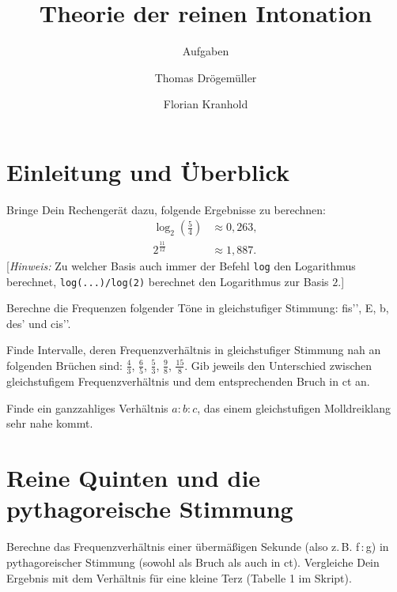 \documentclass[ngerman,11pt]{scrartcl}
\title     {Theorie der reinen Intonation}
\author    {Thomas Drögemüller\and Florian Kranhold}
\subtitle  {Aufgaben}
\begin{document}
\maketitle

\section{Einleitung und Überblick}

\begin{aufg}
  Bringe Dein Rechengerät dazu, folgende Ergebnisse zu berechnen:
  \begin{align*}
    \log_2(\tfrac54) &\approx 0{,}263,\\
    2^{\frac{11}{12}} &\approx 1{,}887.
  \end{align*}
  [\emph{Hinweis:} Zu welcher Basis auch immer der Befehl \texttt{log} den Logarithmus
  berechnet, \texttt{log(...)/log(2)} berechnet den Logarithmus zur Basis $2$.]
\end{aufg}

\begin{aufg}
  Berechne die Frequenzen folgender Töne in gleichstufiger Stimmung: fis’’, E,
  b, des’ und cis’’.
\end{aufg}

\begin{aufg}
  Finde Intervalle, deren Frequenzverhältnis in gleichstufiger Stimmung nah an
  folgenden Brüchen sind: $\frac43$, $\frac65$, $\frac53$, $\frac98$,
  $\frac{15}8$. Gib jeweils den Unterschied zwischen gleichstufigem
  Frequenzverhältnis und dem entsprechenden Bruch in ct an.
\end{aufg}

\begin{aufg}
  Finde ein ganzzahliges Verhältnis $a:b:c$, das einem gleichstufigen
  Molldreiklang sehr nahe kommt.
\end{aufg}

\section{Reine Quinten und die pythagoreische Stimmung}

\begin{aufg}
  Berechne das Frequenzverhältnis einer übermäßigen Sekunde (also
  z.\,B. f\,:\,\sharp g) in pythagoreischer Stimmung (sowohl als Bruch als auch
  in ct). Vergleiche Dein Ergebnis mit dem Verhältnis für eine kleine Terz
  (Tabelle 1 im Skript).
\end{aufg}
\end{document}

